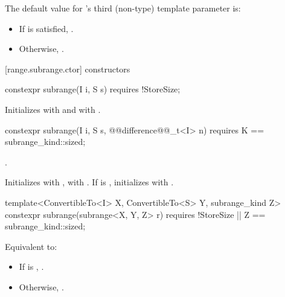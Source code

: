 {{\color{oldclr}
\pnum
The default value for 's third (non-type) template parameter is:
\begin{itemize}
\item If  is satisfied, .
\item Otherwise, .
\end{itemize}
} %

[range.subrange.ctor]{ constructors}

%
\begin{itemdecl}
constexpr subrange(I i, S s) requires !StoreSize;
\end{itemdecl}

\begin{itemdescr}
\pnum
\effects Initializes  with  and  with
.
\end{itemdescr}

%
\begin{itemdecl}
constexpr subrange(I i, S s, @@difference@@_t<I> n)
  requires K == subrange_kind::sized;
\end{itemdecl}

\begin{itemdescr}
\pnum
\oldtxt{\requires} \newtxt{\expects}
.

\pnum
\effects Initializes  with ,  with
. If  is , initializes  with
.
\end{itemdescr}

{\color{oldclr}
%
\begin{itemdecl}
template<ConvertibleTo<I> X, ConvertibleTo<S> Y, subrange_kind Z>
constexpr subrange(subrange<X, Y, Z> r)
  requires !StoreSize || Z == subrange_kind::sized;
\end{itemdecl}

\begin{itemdescr}
\pnum
\effects Equivalent to:
\begin{itemize}
\item If  is ,
.
\item Otherwise, .
\end{itemize}
\end{itemdescr}

}}

